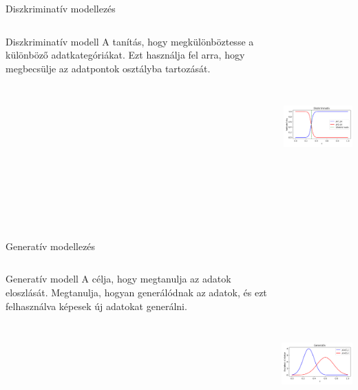\documentclass[english, aspectratio=169]{beamer}
\begin{document}
\begin{frame}{Diszkriminatív modellezés}
\begin{columns}
\begin{column}{.5\textwidth}
\begin{block}{Diszkriminatív modell}
A tanítás, hogy megkülönböztesse a különböző adatkategóriákat. Ezt használja fel arra, hogy megbecsülje az adatpontok osztályba tartozását.
\end{block}
\end{column}
\begin{column}{.5\textwidth}
\begin{center}
\includegraphics[width=7cm, height=7cm, keepaspectratio]{images/generative_1.png}
\end{center}
\end{column}
\end{columns}
\end{frame}

\begin{frame}{Generatív modellezés}
\begin{columns}
\begin{column}{.5\textwidth}
\begin{block}{Generatív modell}
A célja, hogy megtanulja az adatok eloszlását. Megtanulja, hogyan generálódnak az adatok, és ezt felhasználva képesek új adatokat generálni.
\end{block}
\end{column}
\begin{column}{.5\textwidth}
\begin{center}
\includegraphics[width=7cm, height=7cm, keepaspectratio]{images/generative_2.png}
\end{center}
\end{column}
\end{columns}
\end{frame}
\end{document}
